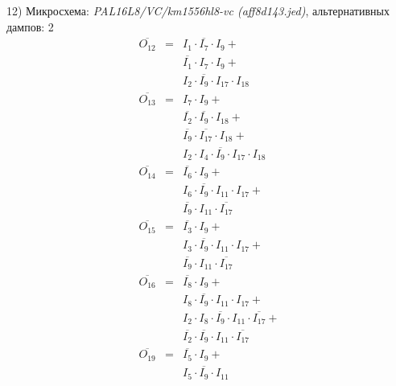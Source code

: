 \documentclass[a4paper,russian]{report}
\begin{document}
12) Микросхема: \emph{PAL16L8/VC/km1556hl8-vc  (aff8d143.jed)}, альтернативных дампов: 2
\nopagebreak\begin{eqnarray*}
    \overline{O_{12}} & = & I_{1} \cdotp \overline{I_{7}} \cdotp I_{9} + \\
	& &  \overline{I_{1}} \cdotp I_{7} \cdotp I_{9} + \\
	& &  I_{2} \cdotp \overline{I_{9}} \cdotp I_{17} \cdotp I_{18} \\
    \overline{O_{13}} & = & I_{7} \cdotp I_{9} + \\
	& &  \overline{I_{2}} \cdotp \overline{I_{9}} \cdotp I_{18} + \\
	& &  \overline{I_{9}} \cdotp \overline{I_{17}} \cdotp I_{18} + \\
	& &  I_{2} \cdotp I_{4} \cdotp \overline{I_{9}} \cdotp I_{17} \cdotp I_{18} \\
    \overline{O_{14}} & = & \overline{I_{6}} \cdotp I_{9} + \\
	& &  I_{6} \cdotp \overline{I_{9}} \cdotp I_{11} \cdotp I_{17} + \\
	& &  \overline{I_{9}} \cdotp I_{11} \cdotp \overline{I_{17}} \\
    \overline{O_{15}} & = & \overline{I_{3}} \cdotp I_{9} + \\
	& &  I_{3} \cdotp \overline{I_{9}} \cdotp I_{11} \cdotp I_{17} + \\
	& &  \overline{I_{9}} \cdotp I_{11} \cdotp \overline{I_{17}} \\
    \overline{O_{16}} & = & \overline{I_{8}} \cdotp I_{9} + \\
	& &  I_{8} \cdotp \overline{I_{9}} \cdotp I_{11} \cdotp I_{17} + \\
	& &  I_{2} \cdotp I_{8} \cdotp \overline{I_{9}} \cdotp I_{11} \cdotp \overline{I_{17}} + \\
	& &  \overline{I_{2}} \cdotp \overline{I_{9}} \cdotp I_{11} \cdotp \overline{I_{17}} \\
    \overline{O_{19}} & = & \overline{I_{5}} \cdotp I_{9} + \\
	& &  I_{5} \cdotp \overline{I_{9}} \cdotp I_{11} \\
 \end{eqnarray*}
\pagebreak[1]
\end{document}
